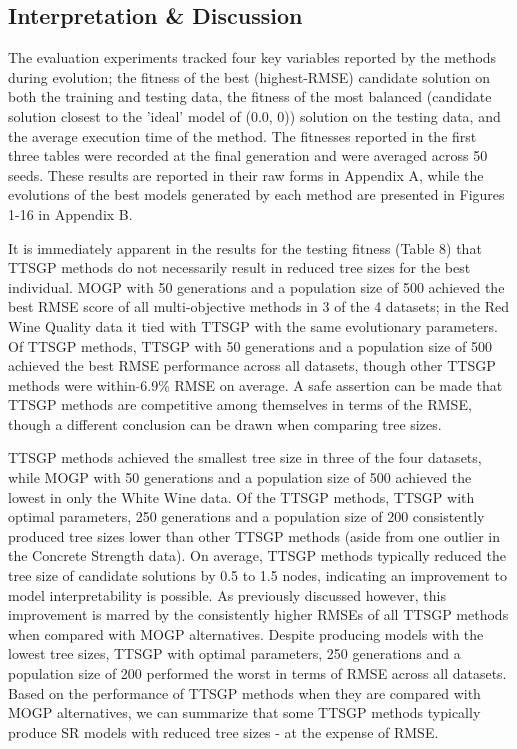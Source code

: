 \documentclass[a4paper, twocolumn]{article}
\begin{document}
\subsection{Interpretation \& Discussion}
The evaluation experiments tracked four key variables reported by the methods during evolution; the fitness of the best (highest-RMSE) candidate solution on both the training and testing data, the fitness of the most balanced (candidate solution closest to the 'ideal' model of (0.0, 0)) solution on the testing data, and the average execution time of the method. The fitnesses reported in the first three tables were recorded at the final generation and were averaged across 50 seeds. These results are reported in their raw forms in Appendix A, while the evolutions of the best models generated by each method are presented in Figures 1-16 in Appendix B.

It is immediately apparent in the results for the testing fitness (Table 8) that TTSGP methods do not necessarily result in reduced tree sizes for the best individual. MOGP with 50 generations and a population size of 500 achieved the best RMSE score of all multi-objective methods in 3 of the 4 datasets; in the Red Wine Quality data it tied with TTSGP with the same evolutionary parameters. Of TTSGP methods, TTSGP with 50 generations and a population size of 500 achieved the best RMSE performance across all datasets, though other TTSGP methods were within $\tilde{}$6.9\% RMSE on average. A safe assertion can be made that TTSGP methods are competitive among themselves in terms of the RMSE, though a different conclusion can be drawn when comparing tree sizes. 

TTSGP methods achieved the smallest tree size in three of the four datasets, while MOGP with 50 generations and a population size of 500 achieved the lowest in only the White Wine data. Of the TTSGP methods, TTSGP with optimal parameters, 250 generations and a population size of 200 consistently produced tree sizes lower than other TTSGP methods (aside from one outlier in the Concrete Strength data). On average, TTSGP methods typically reduced the tree size of candidate solutions by 0.5 to 1.5 nodes, indicating an improvement to model interpretability is possible. As previously discussed however, this improvement is marred by the consistently higher RMSEs of all TTSGP methods when compared with MOGP alternatives. Despite producing models with the lowest tree sizes, TTSGP with optimal parameters, 250 generations and a population size of 200 performed the worst in terms of RMSE across all datasets. Based on the performance of TTSGP methods when they are compared with MOGP alternatives, we can summarize that some TTSGP methods typically produce SR models with reduced tree sizes - at the expense of RMSE.
\end{document}
